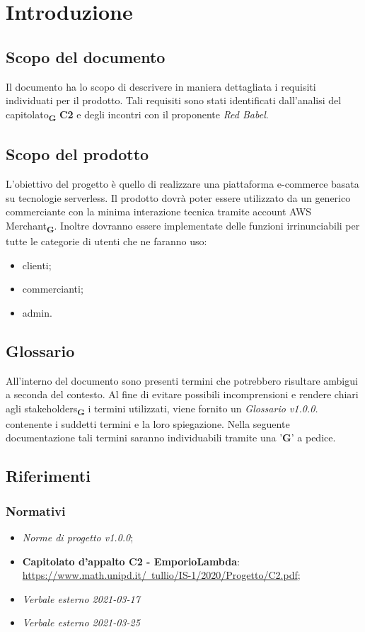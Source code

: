 \section{Introduzione}
\subsection{Scopo del documento}
Il documento ha lo scopo di descrivere in maniera dettagliata i requisiti individuati per il prodotto. Tali requisiti sono stati identificati dall'analisi del capitolato\textsubscript{\textbf{G}} \textbf{C2} e degli incontri con il proponente \textit{Red Babel}.
\subsection{Scopo del prodotto}
L'obiettivo del progetto è quello di realizzare una piattaforma e-commerce basata su tecnologie serverless. Il prodotto dovrà poter essere utilizzato da un generico commerciante con la minima interazione tecnica tramite account AWS Merchant\textsubscript{\textbf{G}}. Inoltre dovranno essere implementate delle funzioni irrinunciabili per tutte le categorie di utenti che ne faranno uso:
\begin{itemize}
    \item clienti;
    \item commercianti;
    \item admin.
\end{itemize}
\subsection{Glossario}
All'interno del documento sono presenti termini che potrebbero risultare ambigui a seconda del contesto. Al fine di evitare possibili incomprensioni
e rendere chiari agli stakeholders\textsubscript{\textbf{G}} i termini utilizzati, viene fornito un \textit{Glossario v1.0.0.} contenente i suddetti termini
e la loro spiegazione. Nella seguente documentazione tali termini saranno individuabili tramite una '\textbf{G}' a pedice.
\subsection{Riferimenti}
\subsubsection{Normativi}
\begin{itemize}
    \item \textit{Norme di progetto v1.0.0};
    \item \textbf{Capitolato d'appalto C2 - EmporioLambda}:\\ \href{https://www.math.unipd.it/~tullio/IS-1/2020/Progetto/C2.pdf}{https://www.math.unipd.it/~tullio/IS-1/2020/Progetto/C2.pdf};
    \item \textit{Verbale esterno 2021-03-17}
    \item \textit{Verbale esterno 2021-03-25}
\end{itemize}
